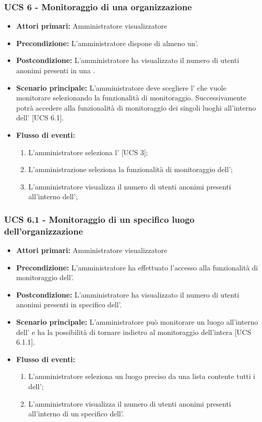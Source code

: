 

\subsubsection{UCS 6 - Monitoraggio di una organizzazione}
\begin{itemize}
	\item \textbf{Attori primari:} Amministratore visualizzatore
	\item \textbf{Precondizione:} L'amministratore dispone di almeno un'.
	\item \textbf{Postcondizione:} L'amministratore ha visualizzato il numero di utenti anonimi presenti in una .
	\item \textbf{Scenario principale:} L'amministratore deve scegliere l' che vuole monitorare selezionando la funzionalità di monitoraggio. Successivamente potrà accedere alla funzionalità di monitoraggio dei singoli luoghi all'interno dell' [UCS 6.1].
	\item \textbf{Flusso di eventi:}
\begin{enumerate}
	\item L'amministratore seleziona l' [UCS 3]; 
	\item L'amministrazione seleziona la funzionalità di monitoraggio dell';
	\item L'amministratore visualizza il numero di utenti anonimi presenti all'interno dell';
\end{enumerate}
\end{itemize}

\subsubsection{UCS 6.1 - Monitoraggio di un specifico luogo dell'organizzazione}
\begin{itemize}
	\item \textbf{Attori primari:} Amministratore visualizzatore
	\item \textbf{Precondizione:} L'amministratore ha effettuato l'accesso alla funzionalità di monitoraggio dell'.
	\item \textbf{Postcondizione:} L'amministratore ha visualizzato il numero di utenti anonimi presenti in specifico  dell'.
	\item \textbf{Scenario principale:} L'amministratore può monitorare un luogo all'interno dell' e ha la possibilità di tornare indietro al monitoraggio dell'intera  [UCS 6.1.1].
	\item \textbf{Flusso di eventi:}
	\begin{enumerate}
	\item L'amministratore seleziona un luogo preciso da una lista contente tutti i  dell';
	\item L'amministratore visualizza il numero di utenti anonimi presenti all'interno di un specifico  dell'.
	\end{enumerate}
\end{itemize}

